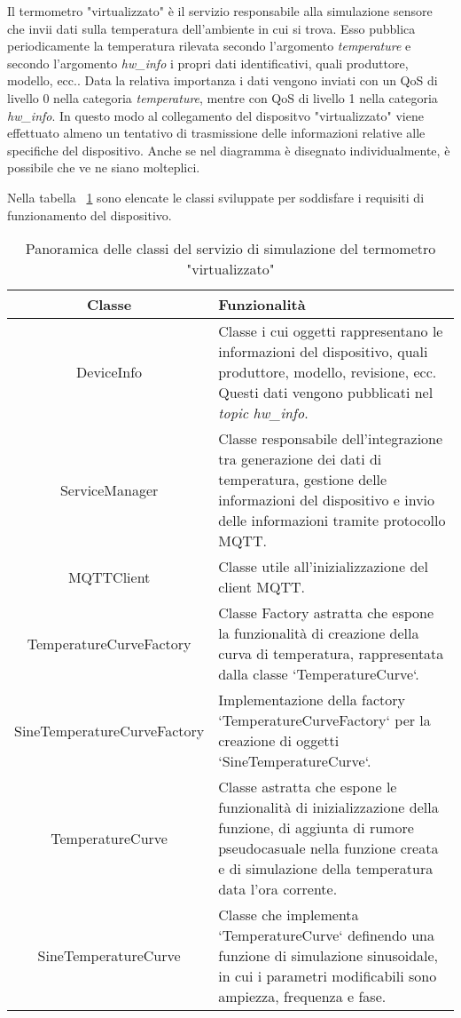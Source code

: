 
Il termometro "virtualizzato" è il servizio responsabile alla simulazione sensore che invii dati sulla temperatura dell'ambiente in cui si trova.
Esso pubblica periodicamente la temperatura rilevata secondo l'argomento \emph{temperature} e secondo l'argomento \emph{hw\_info} i propri dati identificativi, quali produttore, modello, ecc..
Data la relativa importanza i dati vengono inviati con un QoS di livello 0 nella categoria \emph{temperature}, mentre con QoS di livello 1 nella categoria \emph{hw\_info}.
In questo modo al collegamento del dispositvo "virtualizzato" viene effettuato almeno un tentativo di trasmissione delle informazioni relative alle specifiche del dispositivo.
Anche se nel diagramma è disegnato individualmente, è possibile che ve ne siano molteplici.

Nella tabella ~\ref{tab:classi-termometro} sono elencate le classi sviluppate per soddisfare i requisiti di funzionamento del dispositivo.

\begin{table}[H]
\caption{Panoramica delle classi del servizio di simulazione del termometro "virtualizzato"}
\label{tab:classi-termometro}
\begin{tabularx}{\linewidth}{|c|X|}
\hline
\textbf{Classe} & \textbf{Funzionalità} \\
\hline
DeviceInfo & Classe i cui oggetti rappresentano le informazioni del dispositivo, quali produttore, modello, revisione, ecc. Questi dati vengono pubblicati nel \emph{topic} \emph{hw\_info}. \\
\hline
ServiceManager & Classe responsabile dell'integrazione tra generazione dei dati di temperatura, gestione delle informazioni del dispositivo e invio delle informazioni tramite protocollo MQTT. \\
\hline
MQTTClient & Classe utile all'inizializzazione del client MQTT. \\
\hline
TemperatureCurveFactory & Classe Factory astratta che espone la funzionalità di creazione della curva di temperatura, rappresentata dalla classe `TemperatureCurve`. \\
\hline
SineTemperatureCurveFactory & Implementazione della factory `TemperatureCurveFactory` per la creazione di oggetti `SineTemperatureCurve`. \\
\hline
TemperatureCurve & Classe astratta che espone le funzionalità di inizializzazione della funzione, di aggiunta di rumore pseudocasuale nella funzione creata e di simulazione della temperatura data l'ora corrente. \\
\hline
SineTemperatureCurve & Classe che implementa `TemperatureCurve` definendo una funzione di simulazione sinusoidale, in cui i parametri modificabili sono ampiezza, frequenza e fase. \\
\hline
\end{tabularx}
\end{table}

